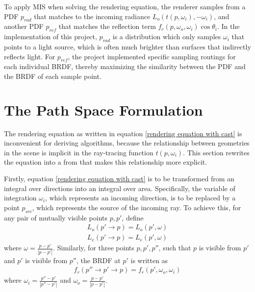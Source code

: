 To apply MIS when solving the rendering equation, the renderer samples from a PDF $p_{rad}$ that matches to the incoming radiance $L_o(t(p,\omega_i),-\omega_i)$, and another PDF $p_{ref}$ that matches the reflection term $f_r(p,\omega_o,\omega_i)\cos\theta_i$. In the implementation of this project, $p_{rad}$ is a distribution which only samples $\omega_i$ that points to a light source, which is often much brighter than surfaces that indirectly reflects light. For $p_{ref}$, the project implemented specific sampling routings for each individual BRDF, thereby maximizing the similarity between the PDF and the BRDF of each sample point.


\section{The Path Space Formulation}
The rendering equation as written in equation \ref{rendering equation with cast} is inconvenient for deriving algorithms, because the relationship between geometries in the scene is implicit in the ray-tracing function $t(p,\omega_i)$. This section rewrites the equation into a from that makes this relationship more explicit.

Firstly, equation \ref{rendering equation with cast} is to be transformed from an integral over directions into an integral over area. Specifically, the variable of integration $\omega_i$, which represents an incoming direction, is to be replaced by a point $p_{src}$, which represents the source of the incoming ray. To achieve this, for any pair of mutually visible points $p,p'$, define 
\begin{align*}
    L_o(p'\to p) = L_o(p',\omega)\\
    L_e(p'\to p) = L_e(p',\omega)
\end{align*}
where $\omega = \frac{p-p'}{|p-p'|}$. Similarly, for three points $p,p',p''$, such that $p$ is visible from $p'$ and $p'$ is visible from $p''$, the BRDF at $p'$ is written as
\begin{align*}
    f_r(p''\to p'\to p) = f_r(p',\omega_o,\omega_i)
\end{align*} 
where $\omega_i = \frac{p''-p'}{|p''-p'|}$ and $\omega_o = \frac{p-p'}{|p-p'|}$.

